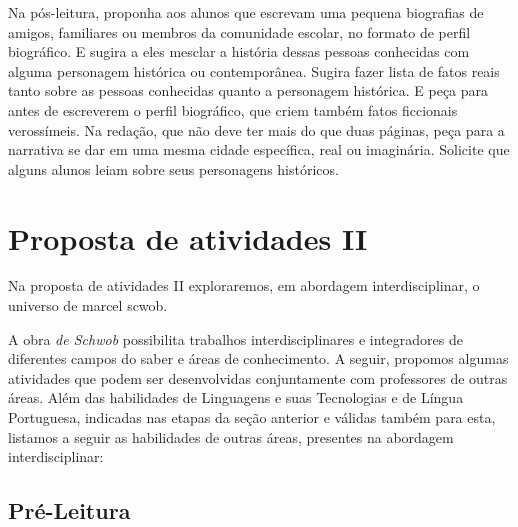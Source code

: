 \documentclass[12pt]{extarticle}
\begin{document}
Na pós-leitura, proponha aos alunos que escrevam uma pequena biografias de amigos, familiares ou membros da comunidade escolar, no formato de perfil biográfico. E sugira a eles mesclar a história dessas
pessoas conhecidas com alguma personagem histórica ou contemporânea. Sugira
fazer lista de fatos reais tanto sobre as pessoas conhecidas quanto a personagem 
histórica. E peça para antes de escreverem o perfil biográfico, que criem também 
fatos ficcionais verossímeis. Na redação, que não deve ter mais do que duas páginas, 
peça para a narrativa se dar em uma mesma cidade específica, real ou imaginária. 
Solicite que alguns alunos leiam sobre seus personagens históricos.  

\section{Proposta de atividades II}


Na proposta de atividades II exploraremos, em abordagem interdisciplinar, 
o universo de marcel scwob.

A obra \emph{de Schwob} possibilita trabalhos interdisciplinares e
integradores de diferentes campos do saber e áreas de conhecimento. A
seguir, propomos algumas atividades que podem ser desenvolvidas
conjuntamente com professores de outras áreas. Além das habilidades de
Linguagens e suas Tecnologias e de Língua Portuguesa, indicadas nas
etapas da seção anterior e válidas também para esta, listamos a seguir
as habilidades de outras áreas, presentes na abordagem
interdisciplinar:


\subsection{Pré-Leitura}
\end{document}
